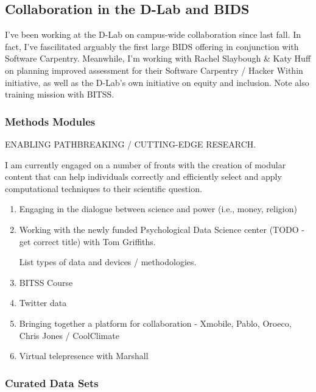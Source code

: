 \subsection*{Collaboration in the D-Lab and BIDS}

I've been working at the D-Lab on campus-wide collaboration since last fall. In
fact, I've fascilitated arguably the first large BIDS offering in conjunction with Software Carpentry.
Meanwhile, I'm working with Rachel Slaybough \& Katy Huff on planning improved
assessment for their Software Carpentry / Hacker Within initiative, as well as
the D-Lab's own initiative on equity and inclusion. Note also training mission
with BITSS.


\subsubsection*{Methods Modules}

ENABLING PATHBREAKING / CUTTING-EDGE RESEARCH.

I am currently engaged on a number of fronts with the creation of modular
content that can help individuals correctly and efficiently select and apply
computational techniques to their scientific question.

\begin{enumerate}
    \item Engaging in the dialogue between science and power (i.e., money,
        religion)

    \item Working with the newly funded Psychological Data Science center (TODO
        - get correct title) with Tom Griffiths.

        List types of data and devices / methodologies.

    \item BITSS Course

    \item Twitter data

    \item Bringing together a platform for collaboration - Xmobile, Pablo,
        Oroeco, Chris Jones / CoolClimate

    \item Virtual telepresence with Marshall
\end{enumerate}

\subsubsection*{Curated Data Sets}

